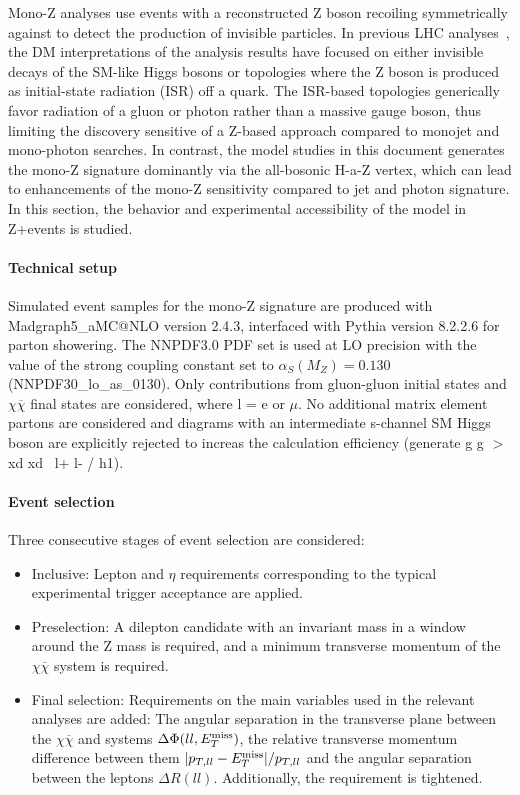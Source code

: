 Mono-Z analyses use events with a reconstructed Z boson recoiling symmetrically against \MET to detect the production of invisible particles.
In previous LHC analyses~\cite{Aaboud:2017bja,Sirunyan:2017qfc}, the DM interpretations of the analysis results have focused on either invisible decays of the SM-like Higgs bosons or topologies where the Z boson is produced as initial-state radiation (ISR) off a quark. The ISR-based topologies generically favor radiation of a gluon or photon rather than a massive gauge boson, thus limiting the discovery sensitive of a Z-based approach compared to monojet and mono-photon searches. In contrast, the model studies in this document generates the mono-Z signature dominantly via the all-bosonic H-a-Z vertex, which can lead to enhancements of the mono-Z sensitivity compared to jet and photon signature. In this section, the behavior and experimental accessibility of the model in Z+\MET events is studied.

\paragraph{Technical setup}
Simulated event samples for the mono-Z signature are produced with Madgraph5\_aMC@NLO version 2.4.3, interfaced with Pythia version 8.2.2.6 for parton showering. The NNPDF3.0 PDF set is used at LO precision with the value of the strong coupling constant set to $\alpha_{S}(M_{Z}) = 0.130$ (NNPDF30\_lo\_as\_0130). Only contributions from gluon-gluon initial states and \lp\lm$\chi\overline{\chi}$ final states are considered, where l = e or $\mu$. No additional matrix element partons are considered and diagrams with an intermediate s-channel SM Higgs boson are explicitly rejected to increas the calculation efficiency (generate g g $>$ xd xd~ l+ l- / h1). 


\paragraph{Event selection}
Three consecutive stages of event selection are considered:
\begin{itemize}
\item Inclusive: Lepton \pt and $\eta$ requirements corresponding to the typical experimental trigger acceptance are applied.

\item Preselection: A dilepton candidate with an invariant mass in a window around the Z mass is required, and a minimum transverse momentum of the $\chi\overline{\chi}$ system is required.

\item Final selection: Requirements on the main variables used in the relevant analyses are added: The angular separation in the transverse plane between the $\chi\overline{\chi}$ and \lp\lm systems $\Delta\Phi(ll,E_T^\mathrm{miss})$, the relative transverse momentum difference between them $|p_{T,ll} - E_T^\mathrm{miss}|/p_{T,ll}$ and the angular separation between the leptons $\Delta R(ll)$. Additionally, the \MET requirement is tightened.
\end{itemize}

